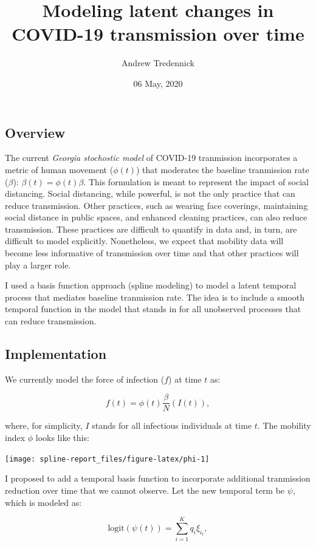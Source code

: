 \documentclass[]{article}
\title{Modeling latent changes in COVID-19 transmission over time}
\author{Andrew Tredennick}
\date{06 May, 2020}
\begin{document}
\maketitle

\hypertarget{overview}{%
\subsection{Overview}\label{overview}}

The current \emph{Georgia stochostic model} of COVID-19 tranmission
incorporates a metric of human movement (\(\phi(t)\)) that moderates the
baseline tranmission rate (\(\beta\)): \(\beta(t) = \phi(t)\beta\). This
formulation is meant to represent the impact of social distancing.
Social distancing, while powerful, is not the only practice that can
reduce transmission. Other practices, such as wearing face coverings,
maintaining social distance in public spaces, and enhanced cleaning
practices, can also reduce transmission. These practices are difficult
to quantify in data and, in turn, are difficult to model explicitly.
Nonetheless, we expect that mobility data will become less informative
of transmission over time and that other practices will play a larger
role.

I used a basis function approach (spline modeling) to model a latent
temporal process that mediates baseline tranmission rate. The idea is to
include a smooth temporal function in the model that stands in for all
unobserved processes that can reduce transmission.

\hypertarget{implementation}{%
\subsection{Implementation}\label{implementation}}

We currently model the force of infection (\(f\)) at time \(t\) as:

\[
f(t) = \phi(t)\frac{\beta}{N} (I(t)),
\]

where, for simplicity, \(I\) stands for all infectious individuals at
time \(t\). The mobility index \(\phi\) looks like this:

\texttt{[image: spline-report\_files/figure-latex/phi-1]}

I proposed to add a temporal basis function to incorporate additional
tranmission reduction over time that we cannot observe. Let the new
temporal term be \(\psi\), which is modeled as:

\[
\text{logit}\left(\psi(t)\right) = \sum_{i=1}^K q_i \xi_{i_t},
\]
\end{document}
